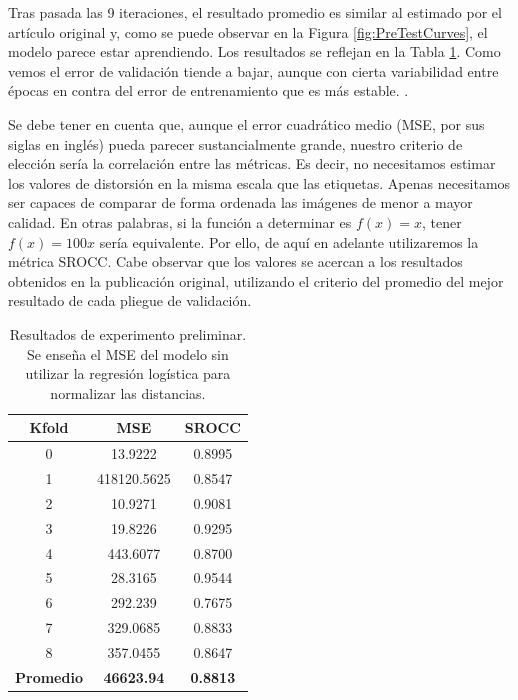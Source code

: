 \egroup

Tras pasada las 9 iteraciones, el resultado promedio es similar al estimado 
por el artículo original y, como se puede observar en la Figura \ref{fig:PreTestCurves},
el modelo parece estar aprendiendo. Los resultados se reflejan
en la Tabla \ref{tab:PreTestResults}. 
Como vemos el error de validación tiende a bajar, aunque con cierta variabilidad 
entre épocas en contra del error de entrenamiento que es más estable. . 

Se debe tener en cuenta que, aunque el error cuadrático medio (MSE, por sus siglas en inglés) pueda parecer 
sustancialmente grande, nuestro criterio de elección sería la correlación 
entre las métricas. Es decir, no necesitamos estimar los valores de distorsión 
en la misma escala que las etiquetas. Apenas necesitamos ser capaces de comparar 
de forma ordenada las imágenes de menor a mayor calidad. En otras palabras, 
si la función a determinar es $f(x) = x$, tener $f(x) = 100x$ sería equivalente.
Por ello, de aquí en adelante utilizaremos la métrica SROCC.
Cabe observar que los valores se acercan a los resultados obtenidos en la publicación original, 
utilizando el criterio del promedio del mejor resultado de cada pliegue de validación. 

\begin{table}[htp]
  \scriptsize
  \begin{center}
    \begin{tabular}[c]{|c|c|c|}
      \hline
      \rowcolor[HTML]{FFC702}
      \textbf{Kfold} & \textbf{MSE} & \textbf{SROCC} \\ 
      \hline 
      0 & 13.9222 & 0.8995 \\
      \hline 
      1 & 418120.5625 & 0.8547 \\ 
      \hline 
      2 & 10.9271 & 0.9081 \\
      \hline 
      3 & 19.8226 & 0.9295 \\ 
      \hline 
      4 & 443.6077 & 0.8700 \\ 
      \hline 
      5 & 28.3165 & 0.9544 \\ 
      \hline 
      6 & 292.239 & 0.7675 \\ 
      \hline 
      7 & 329.0685 & 0.8833 \\ 
      \hline 
      8 & 357.0455 & 0.8647 \\ 
      \hline
      \textbf{\cellcolor[HTML]{FFC702}Promedio} & \textbf{46623.94} & \textbf{0.8813} \\ 
      \hline
    \end{tabular}
  \end{center}
  \caption[Resultados de experimento preliminar.]{
    Resultados de experimento preliminar. 
    Se enseña el MSE del modelo sin utilizar la regresión logística para normalizar las distancias.
  }
  \label{tab:PreTestResults}
\end{table}

